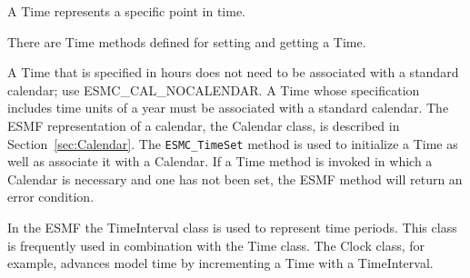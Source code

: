 \label{sec:Time}

A Time represents a specific point in time.

There are Time methods defined for setting and getting a Time.

A Time that is specified in hours does not need to be associated with a 
standard calendar; use ESMC\_CAL\_NOCALENDAR.  A Time whose specification 
includes time units of a year must be associated with a standard calendar. 
The ESMF representation of a calendar, the Calendar class, is described in 
Section~\ref{sec:Calendar}.  The {\tt ESMC\_TimeSet} method is used to 
initialize a Time as well as associate it with a Calendar.  If a Time method 
is invoked in which a Calendar is necessary and one has not been set, the 
ESMF method will return an error condition.

In the ESMF the TimeInterval class is used to represent time periods. 
This class is frequently used in combination with the Time class. 
The Clock class, for example, advances model time by incrementing a 
Time with a TimeInterval. 
